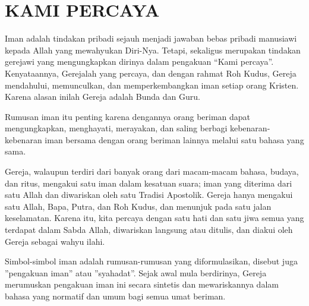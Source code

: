 \newpage
{}
\setcounter{kgkcounter}{29}
{\normalsize
\section*{KAMI PERCAYA}

     Iman adalah tindakan pribadi sejauh menjadi jawaban bebas pribadi manusiawi kepada Allah yang mewahyukan Diri-Nya. Tetapi, sekaligus merupakan tindakan gerejawi yang mengungkapkan dirinya dalam pengakuan ``Kami percaya''.
Kenyataannya, Gerejalah yang percaya, dan dengan rahmat Roh Kudus, Gereja
mendahului, memunculkan, dan memperkembangkan iman setiap orang Kristen.
Karena alasan inilah Gereja adalah Bunda dan Guru.

     Rumusan iman itu penting karena dengannya orang beriman dapat mengungkapkan, menghayati, merayakan, dan saling berbagi kebenaran-kebenaran iman
bersama dengan orang beriman lainnya melalui satu bahasa yang sama.

       Gereja, walaupun terdiri dari banyak orang dari macam-macam bahasa,            budaya, dan ritus, mengakui satu iman dalam kesatuan suara; iman yang diterima        dari satu Allah dan diwariskan oleh satu Tradisi Apostolik. Gereja hanya mengakui
satu Allah, Bapa, Putra, dan Roh Kudus, dan menunjuk pada satu jalan keselamatan.
Karena itu, kita percaya dengan satu hati dan satu jiwa semua yang terdapat dalam
Sabda Allah, diwariskan langsung atau ditulis, dan diakui oleh Gereja sebagai wahyu
ilahi.

     Simbol-simbol iman adalah rumusan-rumusan yang diformulasikan, disebut 
juga ”pengakuan iman” atau ”syahadat”. Sejak awal mula berdirinya, Gereja merumuskan pengakuan iman ini secara sintetis dan mewariskannya dalam bahasa
yang normatif dan umum bagi semua umat beriman.


}